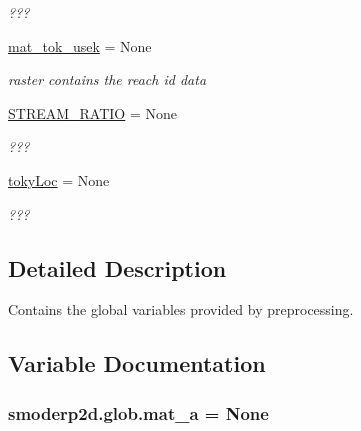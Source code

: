 \begin{DoxyCompactItemize}
\begin{DoxyCompactList}\small\item\em ??? \end{DoxyCompactList}\item 
\hypertarget{namespacesmoderp2d_1_1glob_a7fe31af2edf538f5fd48cddc1d5fd65c}{\hyperlink{namespacesmoderp2d_1_1glob_a7fe31af2edf538f5fd48cddc1d5fd65c}{mat\-\_\-tok\-\_\-usek} = None}\label{namespacesmoderp2d_1_1glob_a7fe31af2edf538f5fd48cddc1d5fd65c}

\begin{DoxyCompactList}\small\item\em raster contains the reach id data \end{DoxyCompactList}\item 
\hypertarget{namespacesmoderp2d_1_1glob_a0bdaa2602be387ce7472b64053a53496}{\hyperlink{namespacesmoderp2d_1_1glob_a0bdaa2602be387ce7472b64053a53496}{S\-T\-R\-E\-A\-M\-\_\-\-R\-A\-T\-I\-O} = None}\label{namespacesmoderp2d_1_1glob_a0bdaa2602be387ce7472b64053a53496}

\begin{DoxyCompactList}\small\item\em ??? \end{DoxyCompactList}\item 
\hypertarget{namespacesmoderp2d_1_1glob_a2baca8d2cdf13c21058288add37663e2}{\hyperlink{namespacesmoderp2d_1_1glob_a2baca8d2cdf13c21058288add37663e2}{toky\-Loc} = None}\label{namespacesmoderp2d_1_1glob_a2baca8d2cdf13c21058288add37663e2}

\begin{DoxyCompactList}\small\item\em ??? \end{DoxyCompactList}\end{DoxyCompactItemize}


\subsection{Detailed Description}
Contains the global variables provided by preprocessing. 

\subsection{Variable Documentation}
\hypertarget{namespacesmoderp2d_1_1glob_af861b29b2e42b3c3b67d16c4c0a70936}{
\subsubsection[{mat\-\_\-a}]{\setlength{\rightskip}{0pt plus 5cm}smoderp2d.\-glob.\-mat\-\_\-a = None}}\label{namespacesmoderp2d_1_1glob_af861b29b2e42b3c3b67d16c4c0a70936}


